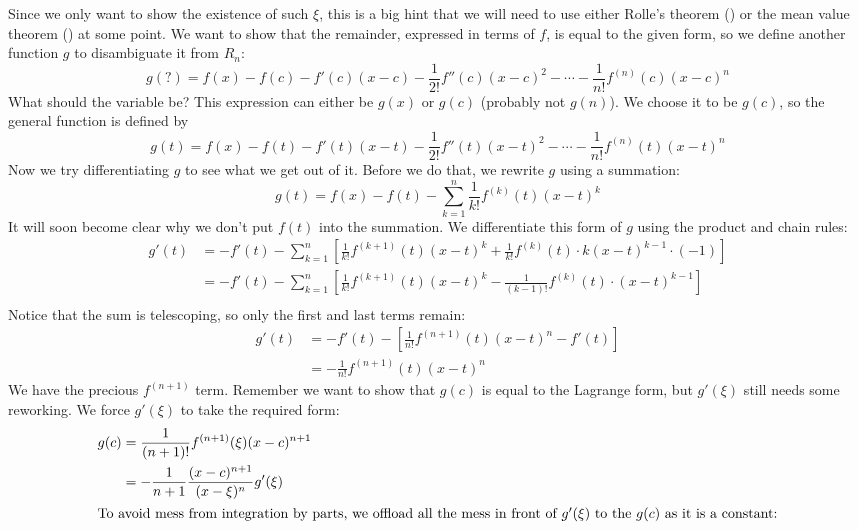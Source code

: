 \begin{intuition}
  Since we only want to show the existence of such $\xi$, this is a big hint that we will need to use either Rolle's theorem () or the mean value theorem () at some point. We want to show that the remainder, expressed in terms of $f$, is equal to the given form, so we define another function $g$ to disambiguate it from $R_n$:
  \[
    g(?) = f(x) - f(c) - f'(c)(x - c) - \frac{1}{2!} f''(c) (x - c) ^ 2 - \cdots - \frac{1}{n!} f ^ {(n)} (c) (x - c) ^ n
  \]
  What should the variable be? This expression can either be $g(x)$ or $g(c)$ (probably not $g(n)$). We choose it to be $g(c)$, so the general function is defined by 
  \[
    g(t) = f(x) - f(t) - f'(t)(x - t) - \frac{1}{2!} f''(t) (x - t) ^ 2 - \cdots - \frac{1}{n!} f ^ {(n)} (t) (x - t) ^ n
  \]
  Now we try differentiating $g$ to see what we get out of it. Before we do that, we rewrite $g$ using a summation:
  \[
    g(t) = f(x) - f(t) - \sum_{k = 1}^{n} \frac{1}{k!} f ^ {(k)} (t) (x - t) ^ k
  \]
  It will soon become clear why we don't put $f(t)$ into the summation. We differentiate this form of $g$ using the product and chain rules:
  \begin{align*}
    g'(t) &= -f'(t) - \sum_{k = 1}^{n} \left[\frac{1}{k!} f ^ {(k + 1)} (t) (x - t) ^ k + \frac{1}{k!} f ^ {(k)} (t) \cdot k(x - t) ^ {k - 1} \cdot (-1)\right] \\
    &= -f'(t) - \sum_{k = 1}^{n} \left[\frac{1}{k!} f ^ {(k + 1)} (t) (x - t) ^ k - \frac{1}{(k - 1)!} f ^ {(k)} (t) \cdot (x - t) ^ {k - 1} \right] \\
  \end{align*}
  Notice that the sum is telescoping, so only the first and last terms remain:
  \begin{align*}
    g'(t) &= -f'(t) - \left[\frac{1}{n!} f ^ {(n + 1)} (t) (x - t) ^ n - f'(t)\right] \\ 
    &= -\frac{1}{n!} f ^ {(n + 1)} (t) (x - t) ^ n
  \end{align*}
  We have the precious $f ^ {(n + 1)}$ term. Remember we want to show that $g(c)$ is equal to the Lagrange form, but $g'(\xi)$ still needs some reworking. We force $g'(\xi)$ to take the required form:
  \begin{align*}
    g(c) &= \frac{1}{(n + 1)!} f ^ {(n + 1)} (\xi) (x - c) ^ {n + 1} \\ 
    &= -\frac{1}{n + 1} \frac{(x - c) ^ {n + 1}}{(x - \xi) ^ n} g'(\xi) \\ 
    \intertext{To avoid mess from integration by parts, we offload all the mess in front of $g'(\xi)$ to the $g(c)$ as it is a constant:}

\end{align*}
\end{intuition}
